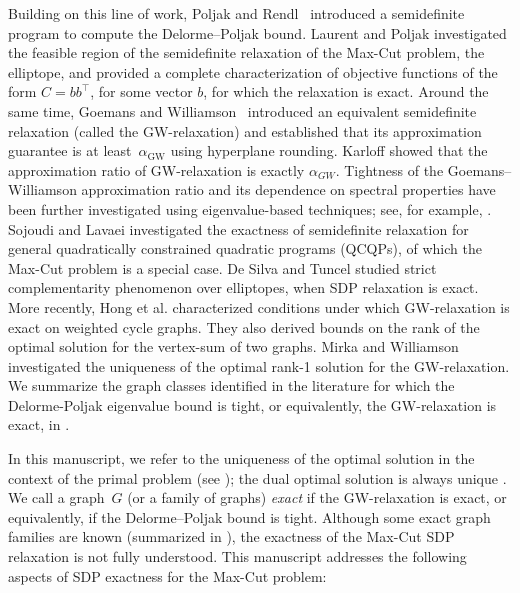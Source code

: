 \documentclass[a4paper,fleqn]{cas-sc}
\newcommand{\1}{\mathbf{1}}
\begin{document}
Building on this line of work, Poljak and Rendl~\citep{poljak1995nonpolyhedral} introduced a semidefinite program to compute the Delorme--Poljak bound. Laurent and Poljak \citep{laurent1995positive} investigated the feasible region of the semidefinite relaxation of the Max-Cut problem, the elliptope, and provided a complete characterization of objective functions of the form \( C = bb^\top \), for some vector \( b \), for which the relaxation is exact. Around the same time, Goemans and Williamson~\citep{goemans1995improved} introduced an equivalent semidefinite relaxation (called the GW-relaxation) and established that its approximation guarantee is at least~$\alpha_{\text{GW}}$ using hyperplane rounding. Karloff \citep{karloff1996good} showed that the approximation ratio of GW-relaxation is exactly $\alpha_{GW}$. Tightness of the Goemans--Williamson approximation ratio and its dependence on spectral properties have been further investigated using eigenvalue-based techniques; see, for example, \citep{alon2000bipartite} \citep{alon2001constructing}. Sojoudi and Lavaei \citep{sojoudi2014exactness} investigated the exactness of semidefinite relaxation for general quadratically constrained quadratic programs (QCQPs), of which the Max-Cut problem is a special case. De Silva and Tuncel \citep{de2019strict} studied strict complementarity phenomenon over elliptopes, when SDP relaxation is exact. More recently, Hong et al. \citep{hong} characterized conditions under which GW-relaxation is exact on weighted cycle graphs. They also derived bounds on the rank of the optimal solution for the vertex-sum of two graphs. Mirka and Williamson \citep{mirka2024max} investigated the uniqueness of the optimal rank-1 solution for the GW-relaxation. We summarize the graph classes identified in the literature for which the Delorme-Poljak eigenvalue bound is tight, or equivalently, the GW-relaxation is exact, in .

In this manuscript, we refer to the uniqueness of the optimal solution in the context of the primal problem (see ); the dual optimal solution is always unique \citep{delorme1993alaplacian, de2019strict}. We call a graph~$G$ (or a family of graphs) \emph{exact} if the GW-relaxation is exact, or equivalently, if the Delorme--Poljak bound is tight. Although some exact graph families are known (summarized in ), the exactness of the Max-Cut SDP relaxation is not fully understood. This manuscript addresses the following aspects of SDP exactness for the Max-Cut problem:
\end{document}
